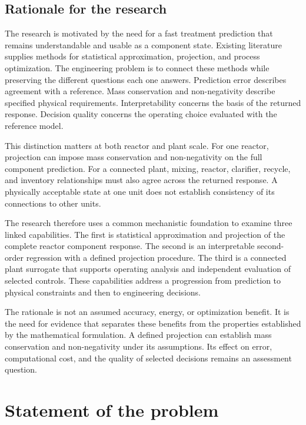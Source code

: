 \subsection{Rationale for the research}

The research is motivated by the need for a fast treatment prediction that remains understandable and usable as a component state. Existing literature supplies methods for statistical approximation, projection, and process optimization. The engineering problem is to connect these methods while preserving the different questions each one answers. Prediction error describes agreement with a reference. Mass conservation and non-negativity describe specified physical requirements. Interpretability concerns the basis of the returned response. Decision quality concerns the operating choice evaluated with the reference model.

This distinction matters at both reactor and plant scale. For one reactor, projection can impose mass conservation and non-negativity on the full component prediction. For a connected plant, mixing, reactor, clarifier, recycle, and inventory relationships must also agree across the returned response. A physically acceptable state at one unit does not establish consistency of its connections to other units.

The research therefore uses a common mechanistic foundation to examine three linked capabilities. The first is statistical approximation and projection of the complete reactor component response. The second is an interpretable second-order regression with a defined projection procedure. The third is a connected plant surrogate that supports operating analysis and independent evaluation of selected controls. These capabilities address a progression from prediction to physical constraints and then to engineering decisions.

The rationale is not an assumed accuracy, energy, or optimization benefit. It is the need for evidence that separates these benefits from the properties established by the mathematical formulation. A defined projection can establish mass conservation and non-negativity under its assumptions. Its effect on error, computational cost, and the quality of selected decisions remains an assessment question.

\section{Statement of the problem}

